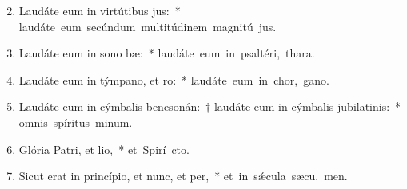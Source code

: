 \begin{flushleft}
\begin{enumerate}[leftmargin=*]
\setcounter{enumi}{1}

\item Laudáte eum in virtútibus jus:~* \mbox{laudáte eum secúndum multitúdinem magnitú jus.}
\item Laudáte eum in sono bæ:~* \mbox{laudáte eum in psaltéri,  thara.}
\item Laudáte eum in týmpano, et ro:~* \mbox{laudáte eum in chor,  gano.}
\item Laudáte eum in cýmbalis benesonán:~† laudáte eum in cýmbalis jubilatinis:~* \mbox{omnis spíritus  minum.}
\item Glória Patri, et lio,~* \mbox{et Spirí cto.}
\item Sicut erat in princípio, et nunc, et per,~* \mbox{et in s\'{\ae}cula sæcu. men.}

\end{enumerate}
\end{flushleft}

